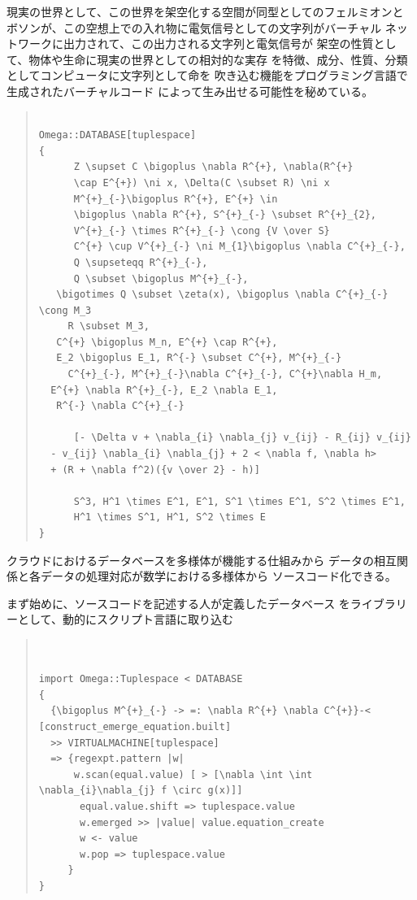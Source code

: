 \documentclass{jsarticle}
\begin{document}
{  現実の世界として、この世界を架空化する空間が同型としてのフェルミオンと
  ボソンが、この空想上での入れ物に電気信号としての文字列がバーチャル
  ネットワークに出力されて、この出力される文字列と電気信号が
  架空の性質として、物体や生命に現実の世界としての相対的な実存
  を特徴、成分、性質、分類としてコンピュータに文字列として命を
  吹き込む機能をプログラミング言語で生成されたバーチャルコード
  によって生み出せる可能性を秘めている。　
\begin{quote}
\setlength{\baselineskip}{12pt}
\begin{verbatim}

Omega::DATABASE[tuplespace]
{
      Z \supset C \bigoplus \nabla R^{+}, \nabla(R^{+} 
      \cap E^{+}) \ni x, \Delta(C \subset R) \ni x   
      M^{+}_{-}\bigoplus R^{+}, E^{+} \in 
      \bigoplus \nabla R^{+}, S^{+}_{-} \subset R^{+}_{2}, 
      V^{+}_{-} \times R^{+}_{-} \cong {V \over S}   
      C^{+} \cup V^{+}_{-} \ni M_{1}\bigoplus \nabla C^{+}_{-}, 
      Q \supseteqq R^{+}_{-}, 
      Q \subset \bigoplus M^{+}_{-}, 
   \bigotimes Q \subset \zeta(x), \bigoplus \nabla C^{+}_{-} \cong M_3   
     R \subset M_3,
   C^{+} \bigoplus M_n, E^{+} \cap R^{+},
   E_2 \bigoplus E_1, R^{-} \subset C^{+}, M^{+}_{-}   
     C^{+}_{-}, M^{+}_{-}\nabla C^{+}_{-}, C^{+}\nabla H_m,
  E^{+} \nabla R^{+}_{-}, E_2 \nabla E_1, 
   R^{-} \nabla C^{+}_{-}   

      [- \Delta v + \nabla_{i} \nabla_{j} v_{ij} - R_{ij} v_{ij} 
  - v_{ij} \nabla_{i} \nabla_{j} + 2 < \nabla f, \nabla h> 
  + (R + \nabla f^2)({v \over 2} - h)]    

      S^3, H^1 \times E^1, E^1, S^1 \times E^1, S^2 \times E^1, 
      H^1 \times S^1, H^1, S^2 \times E
}

\end{verbatim}
\end{quote}


 クラウドにおけるデータベースを多様体が機能する仕組みから
 データの相互関係と各データの処理対応が数学における多様体から
 ソースコード化できる。


 まず始めに、ソースコードを記述する人が定義したデータベース
 をライブラリーとして、動的にスクリプト言語に取り込む
\begin{quote}
\setlength{\baselineskip}{12pt}
\begin{verbatim}


import Omega::Tuplespace < DATABASE
{
  {\bigoplus M^{+}_{-} -> =: \nabla R^{+} \nabla C^{+}}-< [construct_emerge_equation.built]
  >> VIRTUALMACHINE[tuplespace]
  => {regexpt.pattern |w|
      w.scan(equal.value) [ > [\nabla \int \int \nabla_{i}\nabla_{j} f \circ g(x)]]
       equal.value.shift => tuplespace.value
       w.emerged >> |value| value.equation_create 
       w <- value
       w.pop => tuplespace.value
     }
} 
\end{verbatim}
\end{quote}

}
\end{document}

